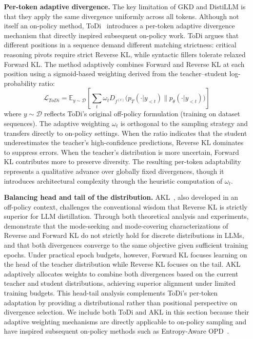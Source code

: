 \documentclass{article} %
\newcommand{\ptheta}{p_\theta}
\newcommand{\pteacher}{p_T}
\begin{document}
\textbf{Per-token adaptive divergence.}
The key limitation of GKD and DistiLLM is that they apply the same divergence uniformly across all tokens. Although not itself an on-policy method, ToDi~\citep{2505.16297} introduces a per-token adaptive divergence mechanism that directly inspired subsequent on-policy work. ToDi argues that different positions in a sequence demand different matching strictness: critical reasoning pivots require strict Reverse KL, while syntactic fillers tolerate relaxed Forward KL. The method adaptively combines Forward and Reverse KL at each position using a sigmoid-based weighting derived from the teacher--student log-probability ratio:
\begin{equation}
    \mathcal{L}_{ToDi} = \mathbb{E}_{y \sim \mathcal{D}} \left[ \sum_t \omega_t D_{f^{(t)}} \big( \pteacher(\cdot|y_{<t}) \parallel \ptheta(\cdot|y_{<t}) \big) \right]
    \label{eq:todi}
\end{equation}
where $y \sim \mathcal{D}$ reflects ToDi's original off-policy formulation (training on dataset sequences). The adaptive weighting $\omega_t$ is orthogonal to the sampling strategy and transfers directly to on-policy settings. When the ratio indicates that the student underestimates the teacher's high-confidence predictions, Reverse KL dominates to suppress errors. When the teacher's distribution is more uncertain, Forward KL contributes more to preserve diversity. The resulting per-token adaptability represents a qualitative advance over globally fixed divergences, though it introduces architectural complexity through the heuristic computation of $\omega_t$.

\textbf{Balancing head and tail of the distribution.}
AKL~\citep{2404.02657}, also developed in an off-policy context, challenges the conventional wisdom that Reverse KL is strictly superior for LLM distillation. Through both theoretical analysis and experiments, \citet{2404.02657} demonstrate that the mode-seeking and mode-covering characterizations of Reverse and Forward KL do not strictly hold for discrete distributions in LLMs, and that both divergences converge to the same objective given sufficient training epochs. Under practical epoch budgets, however, Forward KL focuses learning on the head of the teacher distribution while Reverse KL focuses on the tail. AKL adaptively allocates weights to combine both divergences based on the current teacher and student distributions, achieving superior alignment under limited training budgets. This head-tail analysis complements ToDi's per-token adaptation by providing a distributional rather than positional perspective on divergence selection. We include both ToDi and AKL in this section because their adaptive weighting mechanisms are directly applicable to on-policy sampling and have inspired subsequent on-policy methods such as Entropy-Aware OPD~\citep{2603.07079}.
\end{document}
